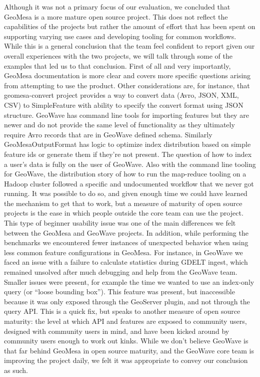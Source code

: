 Although it was not a primary focus of our evaluation, we concluded that GeoMesa is a more mature open source project.
This does not reflect the capabilities of the projects but rather the amount of effort that has been spent on supporting varying use cases and developing tooling for common workflows.
While this is a general conclusion that the team feel confident to report given our overall experiences with the two projects, we will talk through some of the examples that led us to that conclusion.
First of all and very importantly, GeoMesa documentation is more clear and covers more specific questions arising from attempting to use the product.
Other considerations are, for instance, that geomesa-convert project provides a way to convert data (Avro, JSON, XML, CSV) to SimpleFeature with ability to specify the convert format using JSON structure.
GeoWave has command line tools for importing features but they are newer and do not provide the same level of functionality as they ultimately require Avro records that are in GeoWave defined schema.
Similarly GeoMesaOutputFormat has logic to optimize index distribution based on simple feature ids or generate them if they're not present.
The question of how to index a user’s data is fully on the user of GeoWave.
Also with the command line tooling for GeoWave, the distribution story of how to run the map-reduce tooling on a Hadoop cluster followed a specific and undocumented workflow that we never got running.
It was possible to do so, and given enough time we could have learned the mechanism to get that to work, but a measure of maturity of open source projects is the ease in which people outside the core team can use the project.
This type of beginner usability issue was one of the main differences we felt between the GeoMesa and GeoWave projects.
In addition, while performing the benchmarks we encountered fewer instances of unexpected behavior when using less common feature configurations in GeoMesa.
For instance, in GeoWave we faced an issue with a failure to calculate statistics during GDELT ingest, which remained unsolved after much debugging and help from the GeoWave team.
Smaller issues were present, for example the time we wanted to use an index-only query (or “loose bounding box”).
This feature was present, but inaccessible because it was only exposed through the GeoServer plugin, and not through the query API.
This is a quick fix, but speaks to another measure of open source maturity: the level at which API and features are exposed to community users, designed with community users in mind, and have been kicked around by community users enough to work out kinks.
While we don’t believe GeoWave is that far behind GeoMesa in open source maturity, and the GeoWave core team is improving the project daily, we felt it was appropriate to convey our conclusion as such.


